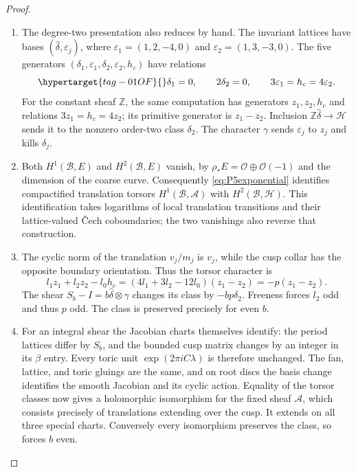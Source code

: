 \begin{proof}
\begin{enumerate}[label=\arabic*.,leftmargin=*]
\item The degree-two presentation also reduces by hand.  The invariant
lattices have bases $(\widehat\delta,\varepsilon_j)$, where
$\varepsilon_1=(1,2,-4,0)$ and $\varepsilon_2=(1,3,-3,0)$.
The five generators $(\delta_1,\varepsilon_1,\delta_2,\varepsilon_2,h_c)$
have relations
\begin{equation}\hypertarget{tag-01OF}{}\label{eq:P5H2}
 \delta_1=0,\qquad 2\delta_2=0,\qquad
 3\varepsilon_1=h_c=4\varepsilon_2.
\end{equation}
For the constant sheaf $\mathbb Z$, the same computation has generators
$z_1,z_2,h_c$ and relations $3z_1=h_c=4z_2$; its primitive generator is
$z_1-z_2$.  Inclusion $\mathbb Z\widehat\delta\to\mathcal H$ sends it
to the nonzero order-two class $\delta_2$.  The character $\gamma$
sends $\varepsilon_j$ to $z_j$ and kills $\delta_j$.

\item Both $H^1(\mathcal B,E)$ and $H^2(\mathcal B,E)$ vanish, by
$\rho_*E=\mathcal O\oplus\mathcal O(-1)$ and the dimension of the coarse
curve.  Consequently \eqref{eq:P5exponential} identifies compactified
translation torsors $H^1(\mathcal B,\mathcal A)$ with
$H^2(\mathcal B,\mathcal H)$.  This identification takes logarithms of
local translation transitions and their lattice-valued \v Cech
coboundaries; the two vanishings also reverse that construction.

\item The cyclic norm of the translation $v_j/m_j$ is $v_j$, while the cusp
collar has the opposite boundary orientation.  Thus the torsor
character is
\[
 l_1z_1+l_2z_2-l_0h_c
 =(4l_1+3l_2-12l_0)(z_1-z_2)=-p(z_1-z_2).
\]
The shear $S_b-I=b\widehat\delta\otimes\gamma$ changes its class by
$-bp\delta_2$.  Freeness forces $l_2$ odd and thus $p$ odd.  The class
is preserved precisely for even $b$.

\item For an integral shear the Jacobian charts themselves identify: the
period lattices differ by $S_b$, and the bounded cusp matrix changes by
an integer in its $\beta$ entry.  Every toric unit
$\exp(2\pi iC\lambda)$ is therefore unchanged.  The fan, lattice, and
toric gluings are the same, and on root discs the basis change
identifies the smooth Jacobian and its cyclic action.  Equality of the
torsor classes now gives a holomorphic isomorphism for the fixed sheaf
$\mathcal A$, which consists precisely of translations extending over
the cusp.  It extends on all three special charts.  Conversely every
isomorphism preserves the class, so forces $b$ even.
\end{enumerate}
\end{proof}